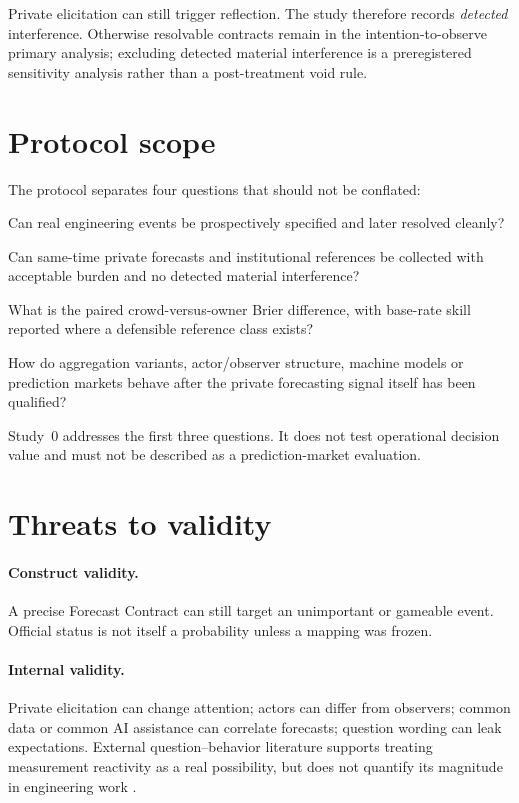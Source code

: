 Private elicitation can still trigger reflection. The study therefore records \emph{detected} interference. Otherwise resolvable contracts remain in the intention-to-observe primary analysis; excluding detected material interference is a preregistered sensitivity analysis rather than a post-treatment void rule.

\section{Protocol scope}
The protocol separates four questions that should not be conflated:

\begin{description}[leftmargin=2.15cm,style=nextline]
\item[Contract feasibility] Can real engineering events be prospectively specified and later resolved cleanly?
\item[Private feasibility] Can same-time private forecasts and institutional references be collected with acceptable burden and no detected material interference?
\item[Incremental signal] What is the paired crowd-versus-owner Brier difference, with base-rate skill reported where a defensible reference class exists?
\item[Mechanism extensions] How do aggregation variants, actor/observer structure, machine models or prediction markets behave after the private forecasting signal itself has been qualified?
\end{description}

Study~0 addresses the first three questions. It does not test operational decision value and must not be described as a prediction-market evaluation.

\section{Threats to validity}
\paragraph{Construct validity.}
A precise Forecast Contract can still target an unimportant or gameable event. Official status is not itself a probability unless a mapping was frozen.

\paragraph{Internal validity.}
Private elicitation can change attention; actors can differ from observers; common data or common AI assistance can correlate forecasts; question wording can leak expectations. External question--behavior literature supports treating measurement reactivity as a real possibility, but does not quantify its magnitude in engineering work \citep{wood2016}.

